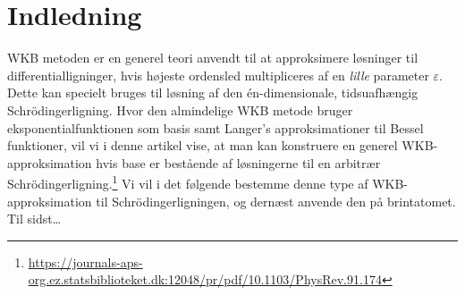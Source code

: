 \section{Indledning}

WKB metoden er en generel teori anvendt til at approksimere løsninger til differentialligninger, hvis højeste ordensled multipliceres af en \emph{lille} parameter $\varepsilon$. Dette kan specielt bruges til løsning af den én-dimensionale, tidsuafhængig Schrödingerligning. Hvor den almindelige WKB metode bruger eksponentialfunktionen som basis samt Langer's approksimationer til Bessel funktioner, vil vi i denne artikel vise, at man kan konstruere en generel WKB-approksimation hvis base er bestående af løsningerne til en arbitrær Schrödingerligning.\footnote{\url{https://journals-aps-org.ez.statsbiblioteket.dk:12048/pr/pdf/10.1103/PhysRev.91.174}}
Vi vil i det følgende bestemme denne type af WKB-approksimation til Schrödingerligningen, og dernæst anvende den på brintatomet. Til sidst\ldots

